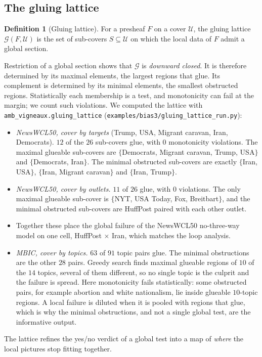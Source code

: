 \documentclass[11pt]{article}
\theoremstyle{definition}
\newtheorem{definition}[theorem]{Definition}
\theoremstyle{remark}
\begin{document}
\subsection{The gluing lattice}\label{sec:fw-lattice}
\begin{definition}[Gluing lattice]
For a presheaf $F$ on a cover $\mathcal U$, the gluing lattice $\mathcal G(F,\mathcal U)$ is the set of sub-covers $S\subseteq\mathcal U$ on which the local data of $F$ admit a global section.
\end{definition}
Restriction of a global section shows that $\mathcal G$ is \emph{downward closed}. It is therefore determined by its maximal elements, the largest regions that glue. Its complement is determined by its minimal elements, the smallest obstructed regions. Statistically each membership is a test, and monotonicity can fail at the margin; we count such violations. We computed the lattice with \texttt{amb\_vigneaux.gluing\_lattice} (\texttt{examples/bias3/gluing\_lattice\_run.py}):
\begin{itemize}
  \item \emph{NewsWCL50, cover by targets} (Trump, USA, Migrant caravan, Iran, Democrats). $12$ of the $26$ sub-covers glue, with $0$ monotonicity violations. The maximal glueable sub-covers are $\{$Democrats, Migrant caravan, Trump, USA$\}$ and $\{$Democrats, Iran$\}$. The minimal obstructed sub-covers are exactly $\{$Iran, USA$\}$, $\{$Iran, Migrant caravan$\}$ and $\{$Iran, Trump$\}$.
  \item \emph{NewsWCL50, cover by outlets.} $11$ of $26$ glue, with $0$ violations. The only maximal glueable sub-cover is $\{$NYT, USA Today, Fox, Breitbart$\}$, and the minimal obstructed sub-covers are HuffPost paired with each other outlet.
  \item Together these place the global failure of the NewsWCL50 no-three-way model on one cell, HuffPost $\times$ Iran, which matches the loop analysis.
  \item \emph{MBIC, cover by topics.} $63$ of $91$ topic pairs glue. The minimal obstructions are the other $28$ pairs. Greedy search finds maximal glueable regions of $10$ of the $14$ topics, several of them different, so no single topic is the culprit and the failure is spread. Here monotonicity fails statistically: some obstructed pairs, for example abortion and white nationalism, lie inside glueable $10$-topic regions. A local failure is diluted when it is pooled with regions that glue, which is why the minimal obstructions, and not a single global test, are the informative output.
\end{itemize}
The lattice refines the yes/no verdict of a global test into a map of \emph{where} the local pictures stop fitting together.
\end{document}
